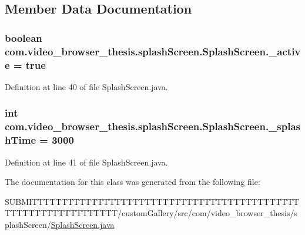 \subsection{Member Data Documentation}
\hypertarget{classcom_1_1video__browser__thesis_1_1splash_screen_1_1_splash_screen_a3303300e142e61273a5efec4a9f07aff}{
\subsubsection[{\-\_\-active}]{\setlength{\rightskip}{0pt plus 5cm}boolean com.\-video\-\_\-browser\-\_\-thesis.\-splash\-Screen.\-Splash\-Screen.\-\_\-active = true\hspace{0.3cm}{\ttfamily [protected]}}}\label{classcom_1_1video__browser__thesis_1_1splash_screen_1_1_splash_screen_a3303300e142e61273a5efec4a9f07aff}


Definition at line 40 of file Splash\-Screen.\-java.

\hypertarget{classcom_1_1video__browser__thesis_1_1splash_screen_1_1_splash_screen_a9f208e3d4ad10a414b7b504c3560a39a}{
\subsubsection[{\-\_\-splash\-Time}]{\setlength{\rightskip}{0pt plus 5cm}int com.\-video\-\_\-browser\-\_\-thesis.\-splash\-Screen.\-Splash\-Screen.\-\_\-splash\-Time = 3000\hspace{0.3cm}{\ttfamily [protected]}}}\label{classcom_1_1video__browser__thesis_1_1splash_screen_1_1_splash_screen_a9f208e3d4ad10a414b7b504c3560a39a}


Definition at line 41 of file Splash\-Screen.\-java.



The documentation for this class was generated from the following file\-:\begin{DoxyCompactItemize}
\item 
S\-U\-B\-M\-I\-T\-T\-T\-T\-T\-T\-T\-T\-T\-T\-T\-T\-T\-T\-T\-T\-T\-T\-T\-T\-T\-T\-T\-T\-T\-T\-T\-T\-T\-T\-T\-T\-T\-T\-T\-T\-T\-T\-T\-T\-T\-T\-T\-T\-T\-T\-T\-T\-T\-T\-T\-T\-T\-T\-T\-T\-T\-T\-T\-T\-T\-T\-T\-T/custom\-Gallery/src/com/video\-\_\-browser\-\_\-thesis/splash\-Screen/\hyperlink{_splash_screen_8java}{Splash\-Screen.\-java}\end{DoxyCompactItemize}
